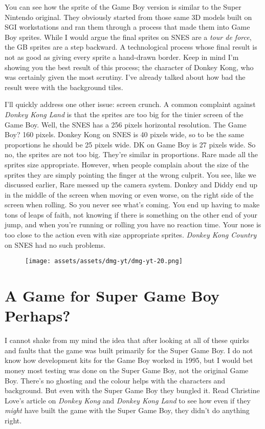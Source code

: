 \documentclass{book}
\begin{document}
You can see how the sprite of the Game Boy version is similar to the Super Nintendo original. They obviously started from those same 3D models built on SGI workstations and ran them through a process that made them into Game Boy sprites. While I would argue the final sprites on SNES are a \emph{tour de force}, the GB sprites are a step backward. A technological process whose final result is not as good as giving every sprite a hand-drawn border. Keep in mind I’m showing you the best result of this process; the character of Donkey Kong, who was certainly given the most scrutiny. I’ve already talked about how bad the result were with the background tiles.

I’ll quickly address one other issue: screen crunch. A common complaint against \emph{Donkey Kong Land} is that the sprites are too big for the tinier screen of the Game Boy. Well, the SNES has a 256 pixels horizontal resolution. The Game Boy? 160 pixels. Donkey Kong on SNES is 40 pixels wide, so to be the same proportions he should be 25 pixels wide. DK on Game Boy is 27 pixels wide. So no, the sprites are not too big. They’re similar in proportions. Rare made all the sprites size appropriate. However, when people complain about the size of the sprites they are simply pointing the finger at the wrong culprit. You see, like we discussed earlier, Rare messed up the camera system. Donkey and Diddy end up in the middle of the screen when moving or even worse, on the right side of the screen when rolling. So you never see what’s coming. You end up having to make tons of leaps of faith, not knowing if there is something on the other end of your jump, and when you’re running or rolling you have no reaction time. Your nose is too close to the action even with size appropriate sprites. \emph{Donkey Kong Country} on SNES had no such problems.

\begin{figure}[hbt]
\vskip 10pt
\centering \texttt{[image: assets/assets/dmg-yt/dmg-yt-20.png]}
\vskip 6pt
\end{figure}

\FloatBarrier\needspace{10mm}\section*{A Game for Super Game Boy Perhaps?}\nopagebreak[4]

I cannot shake from my mind the idea that after looking at all of these quirks and faults that the game was built primarily for the Super Game Boy. I do not know how development kits for the Game Boy worked in 1995, but I would bet money most testing was done on the Super Game Boy, not the original Game Boy. There’s no ghosting and the colour helps with the characters and background. But even with the Super Game Boy they bungled it. Read Christine Love’s article on \emph{Donkey Kong} and \emph{Donkey Kong Land} to see how even if they \emph{might} have built the game with the Super Game Boy, they didn’t do anything right.
\end{document}
